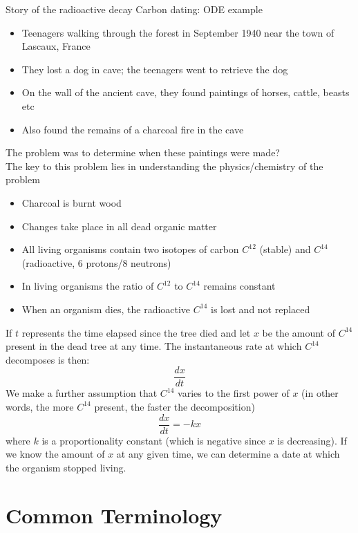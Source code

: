 \begin{testv}{Story of the radioactive decay}{}
Carbon dating: ODE example
\begin{itemize}
\item Teenagers walking through the forest in September 1940 near the town of Lascaux, France
\item They lost a dog in cave; the teenagers went to retrieve the dog
\item On the wall of the ancient cave, they found paintings of horses, cattle, beasts etc
\item Also found the remains of a charcoal fire in the cave
\end{itemize}
The problem was to determine when these paintings were made?\\
The key to this problem lies in understanding the physics/chemistry of the problem
\begin{itemize}
\item Charcoal is burnt wood
\item Changes take place in all dead organic matter
\item All living organisms contain two isotopes of carbon $C^{12}$ (stable) and $C^{14}$ (radioactive, 6 protons/8 neutrons)
\item In living organisms the ratio of $C^{12}$ to $C^{14}$ remains constant
\item When an organism dies, the radioactive $C^{14}$ is lost and not replaced
\end{itemize}
If $t$ represents the time elapsed since the tree died and let $x$ be the amount of $C^{14}$ present in the dead tree at any time. The instantaneous rate at which $C^{14}$ decomposes is then:
\begin{equation}
\frac{dx}{dt}
\end{equation}
We make a further assumption that $C^{14}$ varies to the first power of $x$ (in other words, the more $C^{14}$ present, the faster the decomposition)
\begin{equation}
\frac{dx}{dt}=-kx
\end{equation}
where $k$ is a proportionality constant (which is negative since $x$ is decreasing).
If we know the amount of $x$ at any given time, we can determine a date at which the organism stopped living. 
\end{testv}


\section*{Common Terminology}
